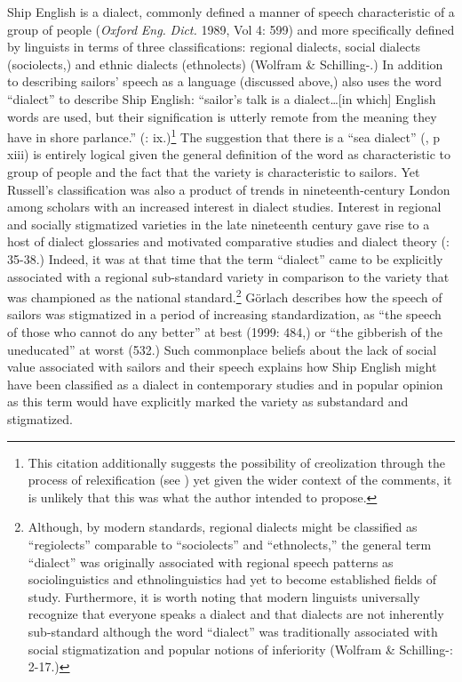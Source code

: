 Ship English is a dialect, commonly defined a manner of speech characteristic of a group of people (\textit{Oxford} \textit{Eng.} \textit{Dict.} 1989, Vol 4: 599) and more specifically defined by linguists in terms of three classifications: regional dialects, social dialects (sociolects,) and ethnic dialects (ethnolects) (Wolfram \& Schilling-\citealt{Estes2016}.) In addition to describing sailors’ speech as a language (discussed above,) \citet{Russell1883} also uses the word “dialect” to describe Ship English: “sailor’s talk is a dialect…[in which] English words are used, but their signification is utterly remote from the meaning they have in shore parlance.” (\citealt{Russell1883}: ix.)\footnote{This citation additionally suggests the possibility of creolization through the process of relexification (see \citealt{Thompson1961}) yet given the wider context of the comments, it is unlikely that this was what the author intended to propose.}  The suggestion that there is a “sea dialect” (\citealt{Russell1883}, p xiii) is entirely logical given the general definition of the word as characteristic to group of people and the fact that the variety is characteristic to sailors. Yet Russell’s classification was also a product of trends in nineteenth-century London among scholars with an increased interest in dialect studies. Interest in regional and socially stigmatized varieties in the late nineteenth century gave rise to a host of dialect glossaries {and motivated comparative studies and dialect theory (\citealt{Petyt1980}: 35-38.) Indeed, it was at that time that the term “dialect” came to be explicitly associated with a regional sub-standard variety in comparison to the variety that was championed as the national standard.}\footnote{{Although}, by modern standards, regional dialects might be classified as “regiolects” {comparable to “sociolects” and “ethnolects,” the general term “dialect” was originally} associated with regional speech patterns as sociolinguistics and ethnolinguistics had yet to become established fields of study. Furthermore,{ it is worth noting that modern} linguists universally recognize that everyone speaks a dialect and that dialects are not inherently sub-standard although the word “dialect” was traditionally associated with social stigmatization and popular notions of inferiority (Wolfram \& Schilling-\citealt{Estes2016}: 2-17.)} {} Görlach describes how{ the} speech of sailors was stigmatized in a period of increasing standardization, as “the speech of those who cannot do any better” at best (1999: 484,) or “the gibberish of the uneducated” at worst (532.){ Such commonplace beliefs about the lack of social value associated with sailors and their speech explains how Ship English might have been classified as a dialect in contemporary studies and in popular opinion as this term would have explicitly marked the variety as substandard and stigmatized.}

